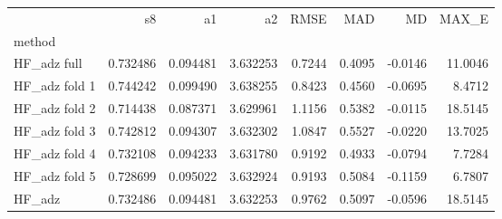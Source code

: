 \begin{tabular}{lrrrrrrr}
 & s8 & a1 & a2 & RMSE & MAD & MD & MAX_E \\
method &  &  &  &  &  &  &  \\
HF_adz full & 0.732486 & 0.094481 & 3.632253 & 0.7244 & 0.4095 & -0.0146 & 11.0046 \\
HF_adz fold 1 & 0.744242 & 0.099490 & 3.638255 & 0.8423 & 0.4560 & -0.0695 & 8.4712 \\
HF_adz fold 2 & 0.714438 & 0.087371 & 3.629961 & 1.1156 & 0.5382 & -0.0115 & 18.5145 \\
HF_adz fold 3 & 0.742812 & 0.094307 & 3.632302 & 1.0847 & 0.5527 & -0.0220 & 13.7025 \\
HF_adz fold 4 & 0.732108 & 0.094233 & 3.631780 & 0.9192 & 0.4933 & -0.0794 & 7.7284 \\
HF_adz fold 5 & 0.728699 & 0.095022 & 3.632924 & 0.9193 & 0.5084 & -0.1159 & 6.7807 \\
HF_adz & 0.732486 & 0.094481 & 3.632253 & 0.9762 & 0.5097 & -0.0596 & 18.5145 \\
\end{tabular}
